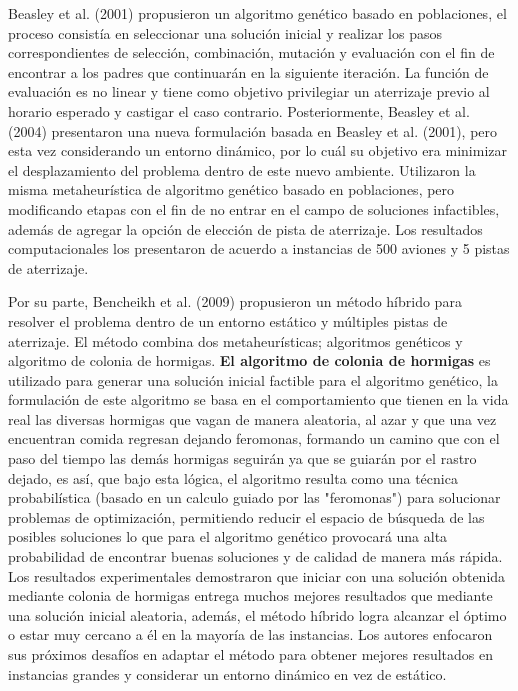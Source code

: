 \documentclass[letter, 10pt]{article}
\begin{document}
Beasley et al. (2001) \cite{article2Europa} propusieron un algoritmo genético basado en poblaciones, el proceso consistía en seleccionar una solución inicial y realizar los pasos correspondientes de selección, combinación, mutación y evaluación con el fin de encontrar a los padres que continuarán en la siguiente iteración. La función de evaluación es no linear y tiene como objetivo privilegiar un aterrizaje previo al horario esperado y castigar el caso contrario.
Posteriormente, Beasley et al. (2004) \cite{BeasleyDinamic} presentaron una nueva formulación basada en Beasley et al. (2001), pero esta vez considerando un entorno dinámico, por lo cuál su objetivo era minimizar el desplazamiento del problema dentro de este nuevo ambiente. Utilizaron la misma metaheurística de algoritmo genético basado en poblaciones, pero modificando etapas con el fin de no entrar en el campo de soluciones infactibles, además de agregar la opción de elección de pista de aterrizaje. Los resultados computacionales los presentaron de acuerdo a instancias de 500 aviones y 5 pistas de aterrizaje.

Por su parte, Bencheikh et al. (2009) propusieron un método híbrido para resolver el problema dentro de un entorno estático y múltiples pistas de aterrizaje. El método combina dos metaheurísticas;
algoritmos genéticos y algoritmo de colonia de hormigas. \textbf{El algoritmo de colonia de hormigas} es utilizado para generar una solución inicial factible para el algoritmo genético, la formulación de este algoritmo se basa en el comportamiento que tienen en la vida real las diversas hormigas que vagan de manera aleatoria, al azar y que una vez encuentran comida regresan dejando feromonas, formando un camino que con el paso del tiempo las demás hormigas seguirán ya que se guiarán por el rastro dejado, es así, que bajo esta lógica, el algoritmo resulta como una técnica probabilística (basado en un calculo guiado por las "feromonas") para solucionar problemas de optimización, permitiendo reducir el espacio de búsqueda de las posibles soluciones lo que para el algoritmo genético provocará una alta probabilidad de encontrar buenas soluciones y de calidad de manera más rápida. Los resultados experimentales demostraron que iniciar con una solución obtenida mediante colonia de hormigas entrega muchos mejores resultados que mediante una solución inicial aleatoria, además, el método híbrido logra alcanzar el óptimo o estar muy cercano a él en la mayoría de las instancias. Los autores enfocaron sus próximos desafíos en adaptar el método para obtener mejores resultados en instancias grandes y considerar un entorno dinámico en vez de estático.
\end{document}
